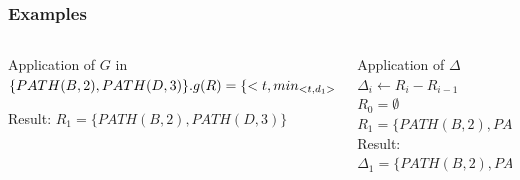 \documentclass{beamer}
\begin{document}
\frame
{
	\frametitle{Examples}
	\begin{columns}	
	
	\begin{column}{0.5 \textwidth}
	Application of $G$ in $ \{ PATH(B,2), PATH(D,3) \}.
	\newline
	\newline
	g(R) = \{ <t,min_{<t,d_{1}> \in R}d_{1}> \mid
	\newline
	<t,d_{1}> \in R  \} $
	
	Result:
	$R_{1} = \{ PATH(B,2), PATH(D,3) \} $
		
	\end{column}
	
	\begin{column}{0.5\textwidth}
	Application of $\Delta$ \\
	$ \Delta_{i} \gets R_{i} - R_{i-1} $
	\\
	$ R_{0} = \emptyset$
	\\
	$ R_{1} = \{ PATH(B,2), PATH(D,3) \} $
	\\
	Result:
	$ \Delta_{1} = \{ PATH(B,2), PATH(D,3) \} $

	\end{column}
	
	\end{columns}
}
\end{document}
